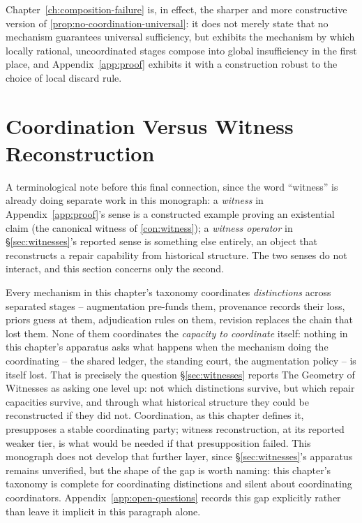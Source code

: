 Chapter~\ref{ch:composition-failure} is, in effect, the sharper and more
constructive version of \cref{prop:no-coordination-universal}: it does
not merely state that no mechanism guarantees universal sufficiency, but
exhibits the mechanism by which locally rational, uncoordinated stages
compose into global insufficiency in the first place, and
Appendix~\ref{app:proof} exhibits it with a construction robust to the
choice of local discard rule.

\section{Coordination Versus Witness Reconstruction}

A terminological note before this final connection, since the word
``witness'' is already doing separate work in this monograph: a
\emph{witness} in Appendix~\ref{app:proof}'s sense is a constructed
example proving an existential claim (the canonical witness of
\cref{con:witness}); a \emph{witness operator} in
\S\ref{sec:witnesses}'s reported sense is something else entirely, an
object that reconstructs a repair capability from historical structure.
The two senses do not interact, and this section concerns only the
second.

Every mechanism in this chapter's taxonomy coordinates \emph{distinctions}
across separated stages -- augmentation pre-funds them, provenance
records their loss, priors guess at them, adjudication rules on them,
revision replaces the chain that lost them. None of them coordinates the
\emph{capacity to coordinate} itself: nothing in this chapter's apparatus
asks what happens when the mechanism doing the coordinating -- the
shared ledger, the standing court, the augmentation policy -- is itself
lost. That is precisely the question \S\ref{sec:witnesses} reports The
Geometry of Witnesses as asking one level up: not which distinctions
survive, but which repair capacities survive, and through what
historical structure they could be reconstructed if they did not.
Coordination, as this chapter defines it, presupposes a stable coordinating
party; witness reconstruction, at its reported weaker tier, is what
would be needed if that presupposition failed. This monograph does not
develop that further layer, since \S\ref{sec:witnesses}'s apparatus
remains unverified, but the shape of the gap is worth naming: this
chapter's taxonomy is complete for coordinating distinctions and silent
about coordinating coordinators. Appendix~\ref{app:open-questions}
records this gap explicitly rather than leave it implicit in this
paragraph alone.
